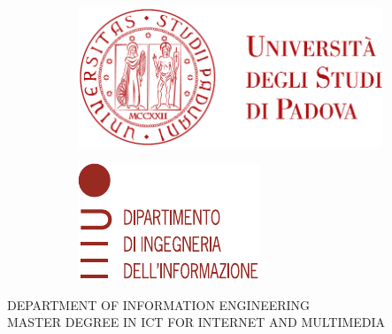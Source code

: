 \begin{titlepage}
        \begin{figure}
            \centering
            \begin{subfigure}[b]{0.4\textwidth}
                \includegraphics[width=\textwidth]{Immagini/logo_unipd}
            \end{subfigure}
            \hfill
            \begin{subfigure}[b]{0.3\textwidth}
                \includegraphics[width=\textwidth]{Immagini/logo_dei}
            \end{subfigure}
        \end{figure}
    
    
        \begin{center}
            \makeatletter %

            \textsc{DEPARTMENT OF INFORMATION ENGINEERING}\\
            \textsc{MASTER DEGREE IN ICT FOR INTERNET AND MULTIMEDIA}
    

\end{center}
\end{titlepage}
